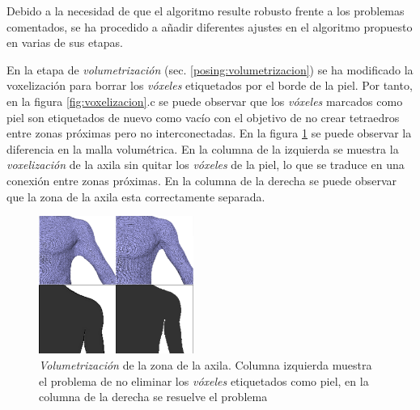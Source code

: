 Debido a la necesidad de que el algoritmo resulte robusto frente a los problemas comentados, se ha procedido a añadir diferentes ajustes en el algoritmo propuesto en varias de sus etapas.

En la etapa de \emph{volumetrización} (sec. \ref{posing:volumetrizacion}) se ha modificado la voxelización  para borrar los \emph{vóxeles} etiquetados por el borde de la piel. Por tanto, en la figura \ref{fig:voxelizacion}.c se puede observar que los \emph{vóxeles} marcados como piel son etiquetados de nuevo como vacío con el objetivo de no crear tetraedros entre zonas próximas pero no interconectadas. En la figura \ref{fig:volsol} se puede observar la diferencia en la malla volumétrica. En la columna de la izquierda se muestra la \emph{voxelización} de la axila sin quitar los \emph{vóxeles} de la piel, lo que se traduce en una conexión entre zonas próximas. En la columna de la derecha se puede observar que la zona de la axila esta correctamente separada.

\begin{figure}[h]
   \centering
    \includegraphics[width=0.45\textwidth]{IMG/volumetrizacion2.png}
    \caption{
    \emph{Volumetrización} de la zona de la axila. Columna izquierda muestra el problema de no eliminar los \emph{vóxeles} etiquetados como piel, en la columna de la derecha se resuelve el problema }
\label{fig:volsol}
\end{figure}


